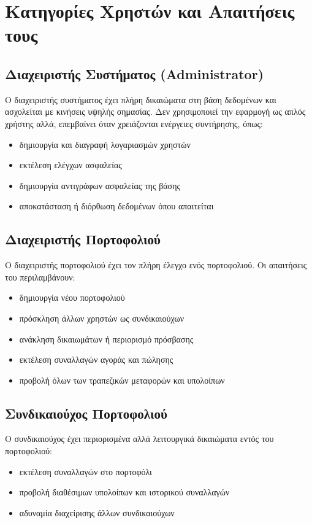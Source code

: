 \documentclass[a4paper,12pt]{article}
\begin{document}
\section{Κατηγορίες Χρηστών και Απαιτήσεις τους}

\subsection*{Διαχειριστής Συστήματος (Administrator)}
Ο διαχειριστής συστήματος έχει πλήρη δικαιώματα στη βάση δεδομένων και ασχολείται με κινήσεις υψηλής σημασίας. Δεν χρησιμοποιεί την εφαρμογή ως απλός χρήστης αλλά, επεμβαίνει όταν χρειάζονται ενέργειες συντήρησης, όπως:
\begin{itemize}
\item δημιουργία και διαγραφή λογαριασμών χρηστών
\item εκτέλεση ελέγχων ασφαλείας
\item δημιουργία αντιγράφων ασφαλείας της βάσης
\item αποκατάσταση ή διόρθωση δεδομένων όπου απαιτείται
\end{itemize}

\subsection*{Διαχειριστής Πορτοφολιού}
Ο διαχειριστής πορτοφολιού έχει τον πλήρη έλεγχο ενός πορτοφολιού. Οι απαιτήσεις
του περιλαμβάνουν:
\begin{itemize}
    \item δημιουργία νέου πορτοφολιού
    \item πρόσκληση άλλων χρηστών ως συνδικαιούχων
    \item ανάκληση δικαιωμάτων ή περιορισμό πρόσβασης
    \item εκτέλεση συναλλαγών αγοράς και πώλησης
    \item προβολή όλων των τραπεζικών μεταφορών και υπολοίπων
\end{itemize}

\subsection*{Συνδικαιούχος Πορτοφολιού}
Ο συνδικαιούχος έχει περιορισμένα αλλά λειτουργικά δικαιώματα εντός του πορτοφολιού:
\begin{itemize}
    \item εκτέλεση συναλλαγών στο πορτοφόλι
    \item προβολή διαθέσιμων υπολοίπων και ιστορικού συναλλαγών
    \item αδυναμία διαχείρισης άλλων συνδικαιούχων
\end{itemize}
\end{document}
